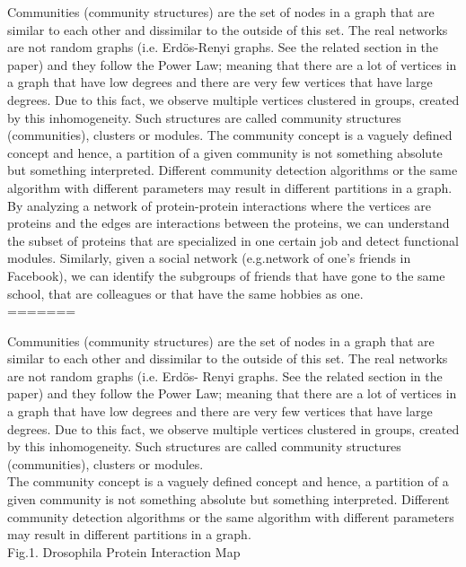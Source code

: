 \documentclass[10pt]{article}
\begin{document}
Communities (community structures) are the set of nodes in a graph that are similar to each other and dissimilar to the outside of this set. The real networks are not random graphs (i.e. Erdös-Renyi graphs. See the related section in the paper) and they follow the Power Law\cite{fortunato}; meaning that there are a lot of vertices in a graph that have low degrees and there are very few vertices that have large degrees. Due to this fact, we observe multiple vertices clustered in groups, created by this inhomogeneity. Such structures are called community structures (communities), clusters or modules. The community concept is a vaguely defined concept and hence, a partition of a given community is not something absolute but something interpreted. Different community detection algorithms or the same algorithm with different parameters may result in different partitions in a graph.\\

By analyzing a network of protein-protein interactions where the vertices are proteins and the edges are interactions between the proteins, we can understand the subset of proteins that are specialized in one certain job and detect functional modules. Similarly, given a social network (e.g.network of one’s friends in Facebook), we can identify the subgroups of friends that have gone to the same school, that are colleagues or that have the same hobbies as one. \\
=======

Communities (community structures) are the set of nodes in a graph that are similar to each other and dissimilar to the outside of this set. The real networks are not random graphs (i.e. Erdös- Renyi graphs. See the related section in the paper) and they follow the Power Law\cite{fortunato}; meaning that there are a lot of vertices in a graph that have low degrees and there are very few vertices that have large degrees. Due to this fact, we observe multiple vertices clustered in groups, created by this inhomogeneity. Such structures are called community structures (communities), clusters or modules. \\

The community concept is a vaguely defined concept and hence, a partition of a given community is not something absolute but something interpreted. Different community detection algorithms or the same algorithm with different parameters may result in different partitions in a graph.\\

Fig.1. Drosophila Protein Interaction Map \cite{protein} \\
\end{document}
